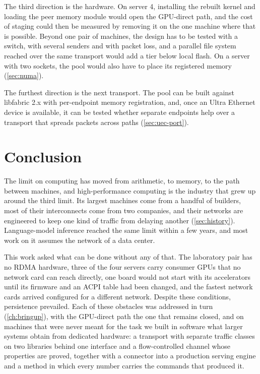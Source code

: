 The third direction is the hardware. On server 4, installing the rebuilt
kernel and loading the peer memory module would open the GPU-direct path,
and the cost of staging could then be measured by removing it on the one
machine where that is possible. Beyond one pair of machines, the design has
to be tested with a switch, with several senders and with packet loss, and a
parallel file system reached over the same transport would add a tier below
local flash. On a server with two sockets, the pool would also have to place
its registered memory (\cref{sec:numa}).

The furthest direction is the next transport. The pool can be built against
libfabric 2.x with per-endpoint memory registration, and, once an Ultra
Ethernet device is available, it can be tested whether separate endpoints
help over a transport that spreads packets across paths
(\cref{sec:uec-port}).

\section{Conclusion}

The limit on computing has moved from arithmetic, to memory, to the path
between machines, and high-performance computing is the industry that grew
up around the third limit. Its largest machines come from a handful of
builders, most of their interconnects come from two companies, and their
networks are engineered to keep one kind of traffic from delaying another
(\cref{sec:history}). Language-model inference reached the same limit within
a few years, and most work on it assumes the network of a data center.

This work asked what can be done without any of that. The laboratory pair
has no RDMA hardware, three of the four servers carry consumer GPUs that no
network card can reach directly, one board would not start with its
accelerators until its firmware and an ACPI table had been changed, and the
fastest network cards arrived configured for a different network. Despite these conditions, persistence prevailed. Each
of these obstacles was addressed in turn (\cref{ch:bringup}), with the
GPU-direct path the one that remains closed, and on machines that were never meant for the task we built
in software what larger systems obtain from dedicated hardware: a transport
with separate traffic classes on two libraries behind one interface and a
flow-controlled channel whose properties are proved, together with a
connector into a production serving engine and a method in which every
number carries the commands that produced it.

